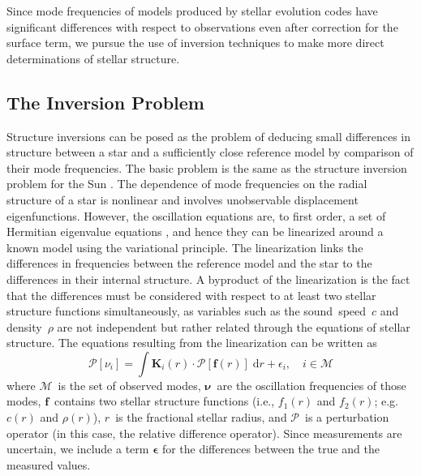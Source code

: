 Since mode frequencies of models produced by stellar evolution codes have significant differences with respect to observations even after correction for the surface term, we pursue the use of inversion techniques to make more direct determinations of stellar structure. 


\subsection{The Inversion Problem}
Structure inversions can be posed as the problem of deducing small differences in structure between a star and a sufficiently close reference model by comparison of their mode frequencies. 
The basic problem is the same as the structure inversion problem for the Sun \citep[for reviews of solar structure inversions, see for example][]{Kosovichev1999, 2016lrsp...13....2b}. 
The dependence of mode frequencies on the radial structure of a star is nonlinear and involves unobservable displacement eigenfunctions. 
However, the oscillation equations are, to first order, a set of Hermitian eigenvalue equations \citep{1964ApJ...139..664C}, and hence they can be linearized around a known model using the variational principle. 
The linearization links the differences in frequencies between the reference model and the star to the differences in their internal structure. 
A byproduct of the linearization is the fact that the differences must be considered with respect to at least two stellar structure functions simultaneously, as variables such as the sound~speed~$c$ and density~$\rho$ are not independent but rather related through the equations of stellar structure. 
The equations resulting from the linearization can be written as 
\begin{equation} \label{eq:inversion}
    \mathscr{P} [\nu_i] = \int \mathbf{K}_i(r) \cdot \mathscr{P} [\boldsymbol{f}(r)] \; \text{d}r + \epsilon_i, \quad i \in \mathscr{M}
\end{equation}
where $\mathscr{M}$~is the set of observed modes, 
$\boldsymbol{\nu}$~are the oscillation frequencies of those modes, 
$\boldsymbol{f}$~contains two stellar structure functions (i.e., ${f_1(r)}$ and ${f_2(r)}$; e.g.~${c(r)}$ and ${\rho(r)}$), 
$r$~is the fractional stellar radius, and 
${\mathscr{P}}$~is a perturbation operator (in this case, the relative difference operator). 
Since measurements are uncertain, we include a term $\boldsymbol \epsilon$ for the differences between the true and the measured values. 
